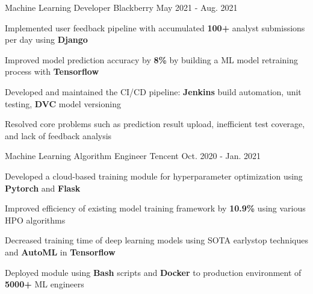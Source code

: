 

\begin{cventries}

  \cventry
    {Machine Learning Developer} %
    {Blackberry} %
    {May 2021 - Aug. 2021} %
    {} %
    {
      \begin{cvitems} %
        \item Implemented user feedback pipeline with accumulated \textbf{100+} analyst submissions per day using \textbf{Django} 
        \item Improved model prediction accuracy by \textbf{8\%} by building a ML model retraining process with \textbf{Tensorflow}
        \item Developed and maintained the CI/CD pipeline: \textbf{Jenkins} build automation, unit testing, \textbf{DVC} model versioning
        \item Resolved core problems such as prediction result upload, inefficient test coverage, and lack of feedback analysis
      \end{cvitems}
    }

  \cventry
    {Machine Learning Algorithm Engineer} %
    {Tencent} %
    {Oct. 2020 - Jan. 2021} %
    {} %
    {
      \begin{cvitems} %
        \item Developed a cloud-based training module for hyperparameter optimization using \textbf{Pytorch} and \textbf{Flask}
        \item Improved efficiency of existing model training framework by \textbf{10.9\%} using various HPO algorithms
        \item Decreased training time of deep learning models using SOTA earlystop techniques and \textbf{AutoML} in \textbf{Tensorflow}
        \item Deployed module using \textbf{Bash} scripts and \textbf{Docker} to production environment of \textbf{5000+} ML engineers
      \end{cvitems}
    }


\end{cventries}
